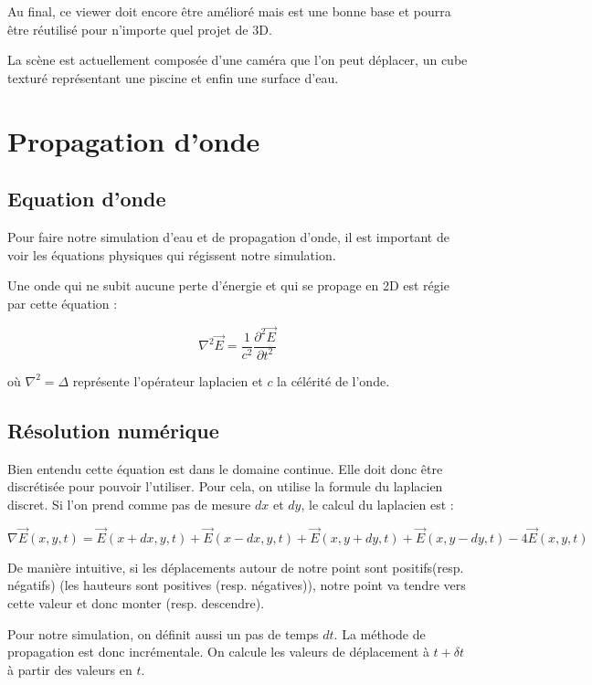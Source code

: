 \documentclass[a4paper,11pt,leqno]{article}
\begin{document}
Au final, ce viewer doit encore être amélioré mais est une bonne base et pourra être réutilisé pour n'importe quel projet de 3D.

La scène est actuellement composée d'une caméra que l'on peut déplacer, un cube texturé représentant une piscine et enfin une surface d'eau.

\section{Propagation d'onde}
\subsection{Equation d'onde}

Pour faire notre simulation d'eau et de propagation d'onde, il est important de voir les équations physiques qui régissent notre simulation.

Une onde qui ne subit aucune perte d'énergie et qui se propage en 2D est régie par cette équation :

\[
    \nabla^2 \overrightarrow{E} = \frac{1}{c^2} \frac{\partial^2 \overrightarrow{E}}{\partial t^2}
\]

où $\nabla^2 = \Delta $ représente l'opérateur laplacien et $c$ la célérité de l'onde.

\subsection{Résolution numérique}

Bien entendu cette équation est dans le domaine continue. Elle doit donc être discrétisée pour pouvoir l'utiliser. Pour cela, on utilise la formule du laplacien discret. Si l'on prend comme pas de mesure $dx$ et $dy$, le calcul du laplacien est :

\[
	\nabla \overrightarrow{E}(x,y,t) = \overrightarrow{E}(x + dx, y, t) +
									 \overrightarrow{E}(x - dx, y, t) +
									 \overrightarrow{E}(x, y + dy, t) +
									 \overrightarrow{E}(x, y - dy, t) -
									 4\overrightarrow{E}(x, y, t)
\]

De manière intuitive, si les déplacements autour de notre point sont positifs(resp. négatifs) (les hauteurs sont positives (resp. négatives)), notre point va tendre vers cette valeur et donc monter (resp. descendre).

Pour notre simulation, on définit aussi un pas de temps $dt$. La méthode de propagation est donc incrémentale. On calcule les valeurs de déplacement à $t + \delta t$ à partir des valeurs en $t$.
\end{document}
